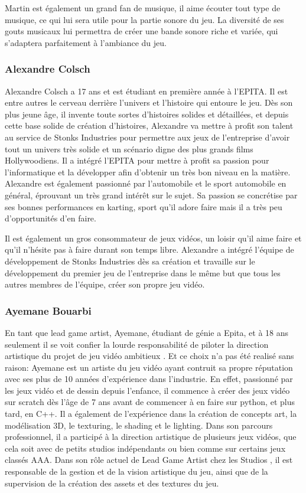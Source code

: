 Martin est également un grand fan de musique, il aime écouter tout type de musique, ce qui lui sera utile pour la partie sonore du jeu.
La diversité de ses gouts musicaux lui permettra de créer une bande sonore riche et variée, qui s'adaptera parfaitement à l'ambiance du jeu.

\subsubsection*{Alexandre Colsch}

Alexandre Colsch a 17 ans et est étudiant en première année à l’EPITA.
Il est entre autres le cerveau derrière l’univers et l’histoire qui entoure le jeu.
Dès son plus jeune âge, il invente toute sortes d’histoires solides et détaillées, et depuis cette base solide de création d’histoires, Alexandre va mettre à profit son talent au service de Stonks Industries pour permettre aux jeux de l’entreprise d’avoir tout un univers très solide et un scénario digne des plus grands films Hollywoodiens.
Il a intégré l’EPITA pour mettre à profit sa passion pour l’informatique et la développer afin d’obtenir un très bon niveau en la matière.
Alexandre est également passionné par l’automobile et le sport automobile en général, éprouvant un très grand intérêt sur le sujet.
Sa passion se concrétise par ses bonnes performances en karting, sport qu’il adore faire mais il a très peu d'opportunités d’en faire.

Il est également un gros consommateur de jeux vidéos, un loisir qu’il aime faire et qu’il n'hésite pas à faire durant son temps libre.
Alexandre a intégré l'équipe de développement de Stonks Industries dès sa création et travaille sur le développement du premier jeu de l’entreprise dans le même but que tous les autres membres de l'équipe, créer son propre jeu vidéo.


\subsubsection*{Ayemane Bouarbi}

En tant que lead game artist, Ayemane, étudiant de génie a Epita, et à 18 ans seulement il se voit confier la lourde responsabilité de piloter la direction artistique du projet de jeu vidéo ambitieux \textit{\gameName}. 
Et ce choix n’a pas été realisé sans raison: Ayemane est un artiste du jeu vidéo ayant contruit sa propre réputation avec ses plus de 10 années d'expérience dans l’industrie. 
En effet, passionné par les jeux vidéo et de dessin depuis l’enfance, il commence à créer des jeux vidéo sur scratch dès l'âge de 7 ans avant de commencer à en faire sur python, et plus tard, en C++. 
Il a également de l’expérience dans la création de concepts art, la modélisation 3D, le texturing, le shading et le lighting.
Dans son parcours professionnel, il a participé à la direction artistique de plusieurs jeux vidéos, que cela soit avec de petits studios indépendants ou bien comme sur certains jeux classés AAA.
Dans son rôle actuel de Lead Game Artist chez les Studios \textit{\companyName}, il est responsable de la gestion et de la vision artistique du jeu, ainsi que de la  supervision de la création des assets et des textures du jeu.


